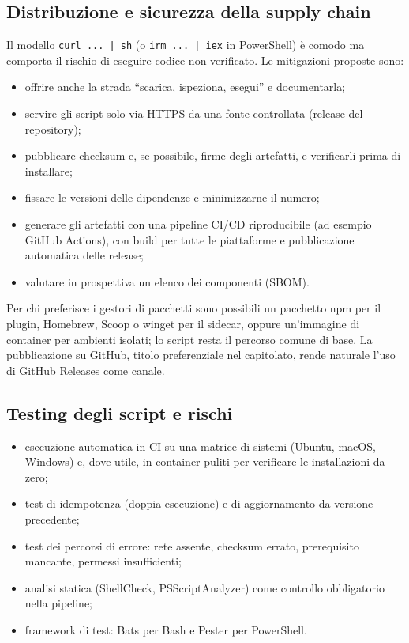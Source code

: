 \documentclass[a4paper, 11pt]{article}
\begin{document}
\subsection{Distribuzione e sicurezza della supply chain}
Il modello \texttt{curl ... | sh} (o \texttt{irm ... | iex} in PowerShell) è comodo ma comporta il rischio di eseguire codice non verificato. Le mitigazioni proposte sono:
\begin{itemize}[noitemsep]
    \item offrire anche la strada ``scarica, ispeziona, esegui'' e documentarla;
    \item servire gli script solo via HTTPS da una fonte controllata (release del repository);
    \item pubblicare checksum e, se possibile, firme degli artefatti, e verificarli prima di installare;
    \item fissare le versioni delle dipendenze e minimizzarne il numero;
    \item generare gli artefatti con una pipeline CI/CD riproducibile (ad esempio GitHub Actions), con build per tutte le piattaforme e pubblicazione automatica delle release;
    \item valutare in prospettiva un elenco dei componenti (SBOM).
\end{itemize}
Per chi preferisce i gestori di pacchetti sono possibili un pacchetto npm per il plugin, Homebrew, Scoop o winget per il sidecar, oppure un'immagine di container per ambienti isolati; lo script resta il percorso comune di base. La pubblicazione su GitHub, titolo preferenziale nel capitolato, rende naturale l'uso di GitHub Releases come canale.

\subsection{Testing degli script e rischi}
\begin{itemize}[noitemsep]
    \item esecuzione automatica in CI su una matrice di sistemi (Ubuntu, macOS, Windows) e, dove utile, in container puliti per verificare le installazioni da zero;
    \item test di idempotenza (doppia esecuzione) e di aggiornamento da versione precedente;
    \item test dei percorsi di errore: rete assente, checksum errato, prerequisito mancante, permessi insufficienti;
    \item analisi statica (ShellCheck, PSScriptAnalyzer) come controllo obbligatorio nella pipeline;
    \item framework di test: Bats per Bash e Pester per PowerShell.
\end{itemize}
\end{document}
